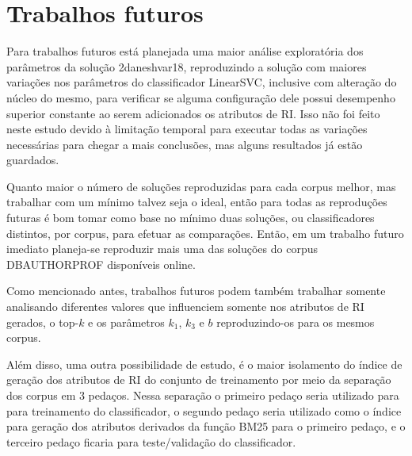 
% 
\section{Trabalhos futuros}
    Para trabalhos futuros está planejada uma maior análise exploratória dos parâmetros da solução 2\underscore{}daneshvar18, reproduzindo a solução com maiores variações nos parâmetros do classificador LinearSVC, inclusive com alteração do núcleo do mesmo, para verificar se alguma configuração dele possui desempenho superior constante ao serem adicionados os atributos de RI. 
    Isso não foi feito neste estudo devido à limitação temporal para executar todas as variações necessárias para chegar a mais conclusões, mas alguns resultados já estão guardados.

    Quanto maior o número de soluções reproduzidas para cada corpus melhor, mas trabalhar com um mínimo talvez seja o ideal, então para todas as reproduções futuras é bom tomar como base no mínimo duas soluções, ou classificadores distintos, por corpus, para efetuar as comparações.
    Então, em um trabalho futuro imediato planeja-se reproduzir mais uma das soluções do corpus DB\underscore{}AUTHORPROF disponíveis online.

    Como mencionado antes, trabalhos futuros podem também trabalhar somente analisando diferentes valores que influenciem somente nos atributos de RI gerados, o top-$k$ e os parâmetros $k_1$, $k_3$ e $b$ reproduzindo-os para os mesmos corpus.

    Além disso, uma outra possibilidade de estudo, é o maior isolamento do índice de geração dos atributos de RI do conjunto de treinamento por meio da separação dos corpus em 3 pedaços.
    Nessa separação o primeiro pedaço seria utilizado para para treinamento do classificador, o segundo pedaço seria utilizado como o índice para geração dos atributos derivados da função BM25 para o primeiro pedaço, e o terceiro pedaço ficaria para teste/validação do classificador.

